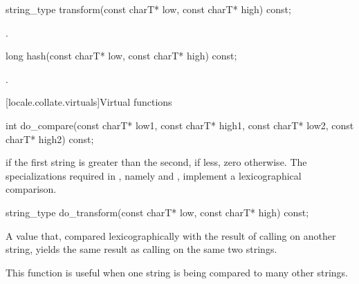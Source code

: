 %
\begin{itemdecl}
string_type transform(const charT* low, const charT* high) const;
\end{itemdecl}

\begin{itemdescr}
\pnum
\returns
{}.
\end{itemdescr}

%
\begin{itemdecl}
long hash(const charT* low, const charT* high) const;
\end{itemdecl}

\begin{itemdescr}
\pnum
\returns
{}.
\end{itemdescr}

[locale.collate.virtuals]{Virtual functions}

%
\begin{itemdecl}
int do_compare(const charT* low1, const charT* high1,
               const charT* low2, const charT* high2) const;
\end{itemdecl}

\begin{itemdescr}
\pnum
\returns
{} if the first string is greater than the second,
 if less,
zero otherwise.
The specializations
required in ,
namely  and ,
implement a lexicographical comparison.
\end{itemdescr}

%
\begin{itemdecl}
string_type do_transform(const charT* low, const charT* high) const;
\end{itemdecl}

\begin{itemdescr}
\pnum
\returns
A  value that,
compared lexicographically with
the result of calling  on another string,
yields the same result as calling  on the same two strings.
\begin{footnote}
This function is useful when one string is being compared to many other strings.
\end{footnote}
\end{itemdescr}

